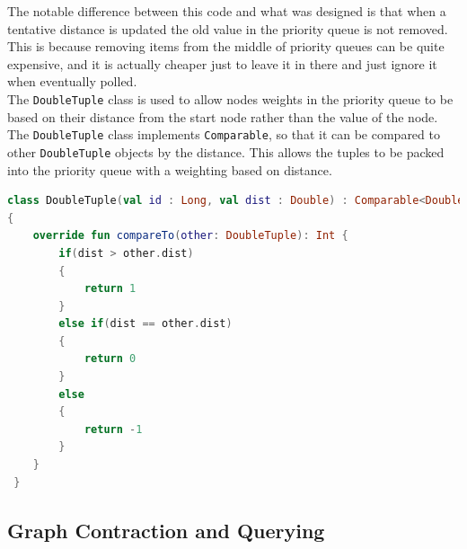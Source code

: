 \documentclass[11pt,twoside,a4paper]{article}
\begin{document}
The notable difference between this code and what was designed is that when a tentative distance is updated the old value in the priority queue is not removed. This is because removing items from the middle of priority queues can be quite expensive,
and it is actually cheaper just to leave it in there and just ignore it when eventually polled.\\
The \texttt{DoubleTuple} class is used to allow nodes weights in the priority queue to be based on their distance from the start node rather than the value of the node. The \texttt{DoubleTuple} class implements \texttt{Comparable}, 
so that it can be compared to other \texttt{DoubleTuple} objects by the distance. This allows the tuples to be packed into the priority queue with a weighting based on distance.
\begin{lstlisting}[language=kotlin]
class DoubleTuple(val id : Long, val dist : Double) : Comparable<DoubleTuple>
{
    override fun compareTo(other: DoubleTuple): Int {
        if(dist > other.dist)
        {
            return 1
        }
        else if(dist == other.dist)
        {
            return 0
        }
        else
        {
            return -1
        }
    }
 }
\end{lstlisting}
\newpage
\subsection{Graph Contraction and Querying}
\end{document}
